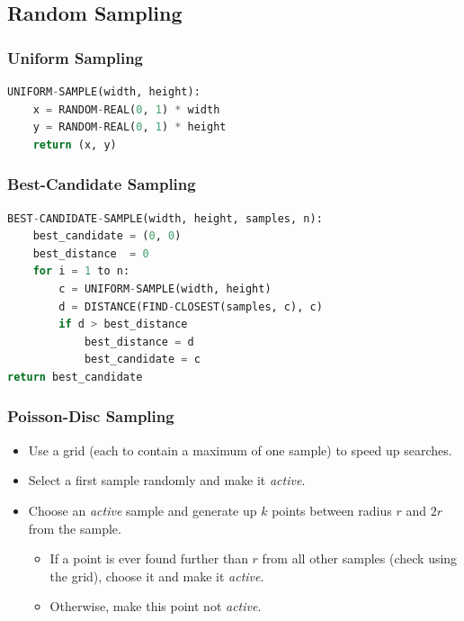 \documentclass[twocolumn,english]{article}
\numberwithin{equation}{section}
\numberwithin{figure}{section}
\numberwithin{table}{section}
\begin{document}
\subsection{Random Sampling}

\subsubsection*{Uniform Sampling}

\begin{lstlisting}[language=Python,basicstyle={\footnotesize\ttfamily},tabsize=4,frame=single]
UNIFORM-SAMPLE(width, height):
	x = RANDOM-REAL(0, 1) * width
	y = RANDOM-REAL(0, 1) * height
	return (x, y)
\end{lstlisting}

\subsubsection*{Best-Candidate Sampling}

\begin{lstlisting}[language=Python,basicstyle={\footnotesize\ttfamily},tabsize=4,frame=single]
BEST-CANDIDATE-SAMPLE(width, height, samples, n):
	best_candidate = (0, 0)
	best_distance  = 0
	for i = 1 to n:
		c = UNIFORM-SAMPLE(width, height)
		d = DISTANCE(FIND-CLOSEST(samples, c), c)
		if d > best_distance
			best_distance = d
			best_candidate = c
return best_candidate
\end{lstlisting}

\subsubsection*{Poisson-Disc Sampling}
\begin{itemize}
\item Use a grid (each to contain a maximum of one sample) to speed up searches.
\item Select a first sample randomly and make it \emph{active}.
\item Choose an \emph{active} sample and generate up $k$ points between
radius $r$ and $2r$ from the sample.
\begin{itemize}
\item If a point is ever found further than $r$ from all other samples
(check using the grid), choose it and make it \emph{active}.
\item Otherwise, make this point not \emph{active}.
\end{itemize}
\end{itemize}
\end{document}

